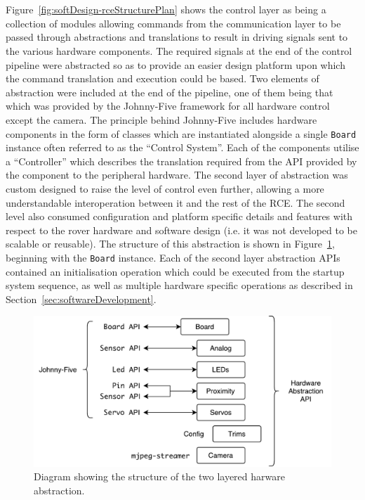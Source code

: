         \\\\
          Figure~\ref{fig:softDesign-rceStructurePlan} shows the control layer as being a collection of modules allowing commands from the communication layer to be passed through abstractions and translations to result in driving signals sent to the various hardware components. The required signals at the end of the control pipeline were abstracted so as to provide an easier design platform upon which the command translation and execution could be based. Two elements of abstraction were included at the end of the pipeline, one of them being that which was provided by the Johnny-Five framework for all hardware control except the camera. The principle behind Johnny-Five includes hardware components in the form of classes which are instantiated alongside a single \texttt{Board} instance often referred to as the ``Control System''. Each of the components utilise a ``Controller'' which describes the translation required from the API provided by the component to the peripheral hardware. The second layer of abstraction was custom designed to raise the level of control even further, allowing a more understandable interoperation between it and the rest of the RCE. The second level also consumed configuration and platform specific details and features with respect to the rover hardware and software design (i.e. it was not developed to be scalable or reusable). The structure of this abstraction is shown in Figure~\ref{fig:softDesign-hardwareAbstractionStructure}, beginning with the \texttt{Board} instance. Each of the second layer abstraction APIs contained an initialisation operation which could be executed from the startup system sequence, as well as multiple hardware specific operations as described in Section~\ref{sec:softwareDevelopment}.
          
          \begin{figure}[h!]
            \centering
            \includegraphics[width=0.7\linewidth]{figures/softDesign-hardwareAbstractionStructure}
            \caption[Diagram showing the structure of the two layered harware abstraction.]{Diagram showing the structure of the two layered harware abstraction.}
            \label{fig:softDesign-hardwareAbstractionStructure}
          \end{figure}
          

